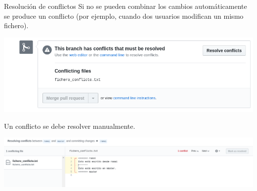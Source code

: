 \documentclass[xcolor={usenames,svgnames,dvipsnames}]{beamer}
\begin{document}
\begin{frame}[label={sec:org06682bf}]{Resolución de conflictos}
Si no se pueden combinar los cambios automáticamente se produce un conflicto (por ejemplo, cuando dos usuarios modifican un mismo fichero).

\begin{center}
\includegraphics[width=.9\linewidth]{figs/conflict_web.png}
\end{center}

Un conflicto se debe resolver manualmente.
\begin{center}
\includegraphics[width=.9\linewidth]{figs/resolve_conflict_web.png}
\end{center}
\end{frame}
\end{document}
